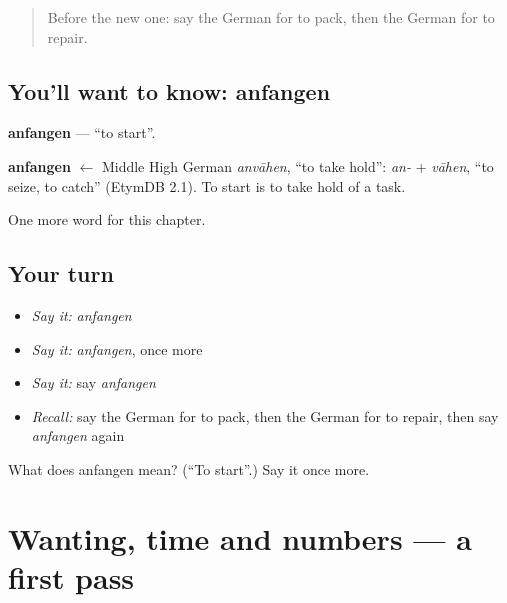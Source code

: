 \begin{quote}
Before the new one: say the German for to pack, then the German for to repair.
\end{quote}

\subsection*{You'll want to know: anfangen}
\textbf{anfangen} — \textquotedblleft{}to start\textquotedblright{}.

\begin{cousinweb}
\textbf{anfangen} $\leftarrow$ Middle High German \emph{anvāhen}, \textquotedblleft{}to take hold\textquotedblright{}: \emph{an-} + \emph{vāhen}, \textquotedblleft{}to seize, to catch\textquotedblright{} (EtymDB 2.1). To start is to take hold of a task.
\end{cousinweb}

\begin{grammarlens}[title={What you've built}]
One more word for this chapter.
\end{grammarlens}

\subsection*{Your turn}
\begin{itemize}
\raggedright
  \item \emph{Say it:} \emph{anfangen}
  \item \emph{Say it:} \emph{anfangen}, once more
  \item \emph{Say it:} say \emph{anfangen}
  \item \emph{Recall:} say the German for to pack, then the German for to repair, then say \emph{anfangen} again
\end{itemize}

\begin{tcolorbox}[breakable,colback=teal!4,colframe=teal!35!black,title={Before you move on}]
What does anfangen mean? (\textquotedblleft{}To start\textquotedblright{}.) Say it once more.
\end{tcolorbox}
\section[(dialogue)]{Wanting, time and numbers — a first pass}

\label{lesson:GE-R141-first-pass-wanting-time-and-numbers}



